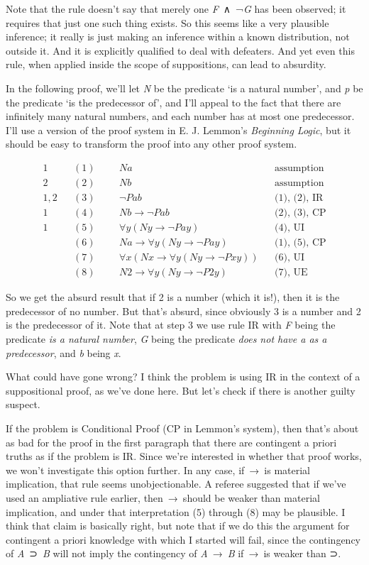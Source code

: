 \documentclass[
  10pt,
  letterpaper,
  DIV=11,
  numbers=noendperiod,
  twoside]{scrartcl}
\begin{document}
Note that the rule doesn't say that merely one \emph{F}~∧~¬\emph{G} has
been observed; it requires that just one such thing exists. So this
seems like a very plausible inference; it really is just making an
inference within a known distribution, not outside it. And it is
explicitly qualified to deal with defeaters. And yet even this rule,
when applied inside the scope of suppositions, can lead to absurdity.

In the following proof, we'll let \emph{N} be the predicate `is a
natural number', and \emph{p} be the predicate `is the predecessor of',
and I'll appeal to the fact that there are infinitely many natural
numbers, and each number has at most one predecessor. I'll use a version
of the proof system in E. J. Lemmon's \emph{Beginning Logic}, but it
should be easy to transform the proof into any other proof system.

\[
\begin{aligned}
1 && (1) && &Na && \text{assumption} \\
2 && (2) && &Nb && \text{assumption} \\
1, 2 && (3) && &\neg Pab && \text{(1), (2), IR} \\
1 && (4)  && &Nb \rightarrow \neg Pab && \text{(2), (3), CP} \\
1 && (5)  && &\forall y (Ny \rightarrow \neg Pay) && \text{(4), UI} \\
 && (6)  && &Na \rightarrow \forall y (Ny \rightarrow \neg Pay) && \text{(1), (5), CP} \\
 && (7) && &\forall x (Nx \rightarrow \forall y (Ny \rightarrow \neg Pxy)) && \text{(6), UI} \\
 && (8) && &N2 \rightarrow \forall y (Ny \rightarrow \neg P2y) && \text{(7), UE}
\end{aligned}
\]

So we get the absurd result that if 2 is a number (which it is!), then
it is the predecessor of no number. But that's absurd, since obviously 3
is a number and 2 is the predecessor of it. Note that at step 3 we use
rule IR with \emph{F} being the predicate \emph{is a natural number},
\emph{G} being the predicate \emph{does not have a as a predecessor},
and \emph{b} being \emph{x}.

What could have gone wrong? I think the problem is using IR in the
context of a suppositional proof, as we've done here. But let's check if
there is another guilty suspect.

If the problem is Conditional Proof (CP in Lemmon's system), then that's
about as bad for the proof in the first paragraph that there are
contingent a priori truths as if the problem is IR. Since we're
interested in whether that proof works, we won't investigate this option
further. In any case, if~→~is material implication, that rule seems
unobjectionable. A referee suggested that if we've used an ampliative
rule earlier, then~→~should be weaker than material implication, and
under that interpretation (5) through (8) may be plausible. I think that
claim is basically right, but note that if we do this the argument for
contingent a priori knowledge with which I started will fail, since the
contingency of \emph{A}~⊃~\emph{B} will not imply the contingency of
\emph{A}~→~\emph{B} if~→~is weaker than ⊃.
\end{document}
